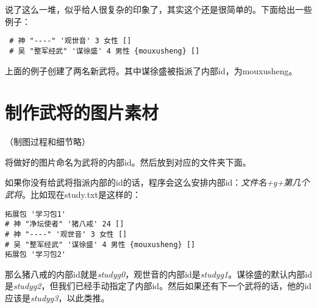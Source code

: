 说了这么一堆，似乎给人很复杂的印象了，其实这个还是很简单的。下面给出一些例子：

\begin{verbatim}
 # 神 "----" '观世音' 3 女性 []
 # 吴 "整军经武" '谋徐盛' 4 男性 {mouxusheng} []
\end{verbatim}

上面的例子创建了两名新武将。其中谋徐盛被指派了内部id，为mouxusheng。\\


\section{制作武将的图片素材}

（制图过程和细节略）

将做好的图片命名为武将的内部id。然后放到对应的文件夹下面。

如果你没有给武将指派内部的id的话，程序会这么安排内部id：\textit{文件名+g+第几个武将}。比如现在study.txt是这样的：

\begin{verbatim}
拓展包 '学习包1'
# 神 "净坛使者" '猪八戒' 24 []
# 神 "----" '观世音' 3 女性 []
# 吴 "整军经武" '谋徐盛' 4 男性 {mouxusheng} []
拓展包 '学习包2'
\end{verbatim}

那么猪八戒的内部id就是\textit{studyg0}，观世音的内部id是\textit{studyg1}。谋徐盛的默认内部id是\textit{studyg2}，但我们已经手动指定了内部id。然后如果还有下一个武将的话，他的id应该是\textit{studyg3}，以此类推。




